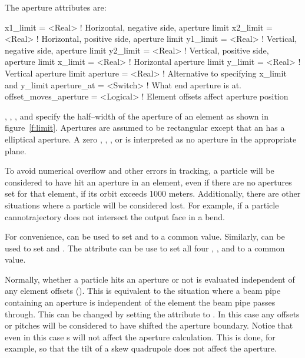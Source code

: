 The aperture attributes are:
\begin{example}
  x1_limit    = <Real>      ! Horizontal, negative side, aperture limit
  x2_limit    = <Real>      ! Horizontal, positive side, aperture limit
  y1_limit    = <Real>      ! Vertical, negative side, aperture limit
  y2_limit    = <Real>      ! Vertical, positive side, aperture limit
  x_limit     = <Real>      ! Horizontal aperture limit
  y_limit     = <Real>      ! Vertical aperture limit
  aperture    = <Real>      ! Alternative to specifying x_limit and y_limit
  aperture_at = <Switch>    ! What end aperture is at.
  offset_moves_aperture = <Logical> ! Element offsets affect aperture position
\end{example}
, , , and  specify
the half--width of the aperture of an element as shown in
figure~\ref{f:limit}. Apertures are assumed to be rectangular except
that an  has a elliptical aperture. 
A zero , , , or
 is interpreted as no aperture in the appropriate plane.

To avoid numerical overflow and other errors in tracking, a particle
will be considered to have hit an aperture in an element, even if
there are no apertures set for that element, if its orbit exceeds 1000
meters. Additionally, there are other situations where a particle will
be considered lost. For example, if a particle cannotrajectory does
not intersect the output face in a bend.

For convenience,  can be used to set  and
 to a common value. Similarly,  can be used
to set  and .  The  attribute
can be use to set all four , , 
and  to a common value.

Normally, whether a particle hits an aperture or not is evaluated
independent of any element offsets (). This is equivalent
to the situation where a beam pipe containing an aperture is
independent of the element the beam pipe passes through. This can be
changed by setting the  attribute to
. In this case any offsets or pitches will be considered to
have shifted the aperture boundary. Notice that even in this case
s will not affect the aperture calculation. This is done, for
example, so that the tilt of a skew quadrupole does not affect the
aperture.

